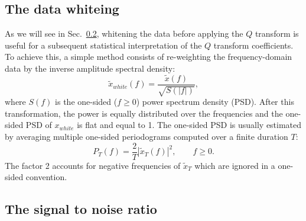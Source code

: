 \subsection{The data whiteing} \label{sec:method:whitening}

As we will see in Sec.~\ref{sec:method:snr}, whitening the data before applying the $Q$ transform is useful for a subsequent statistical interpretation of the $Q$ transform coefficients. To achieve this, a simple method consists of re-weighting the frequency-domain data by the inverse amplitude spectral density:
\begin{equation}
  \tilde{x}_{white}(f) = \frac{\tilde{x}(f)}{\sqrt{S(|f|)}},
  \label{eq:whitening}
\end{equation}
where $S(f)$ is the one-sided ($f \ge 0$) power spectrum density (PSD). After this transformation, the power is equally distributed over the frequencies and the one-sided PSD of $x_{white}$ is flat and equal to 1. The one-sided PSD is usually estimated by averaging multiple one-sided periodograms computed over a finite duration $T$:
\begin{equation}
  P_T(f) = \frac{2}{T}\left|\tilde{x}_T(f)\right|^2, \qquad f \ge 0.
  \label{eq:periodogram}
\end{equation}
The factor 2 accounts for negative frequencies of $\tilde{x}_T$ which are ignored in a one-sided convention.


\subsection{The signal to noise ratio} \label{sec:method:snr}

